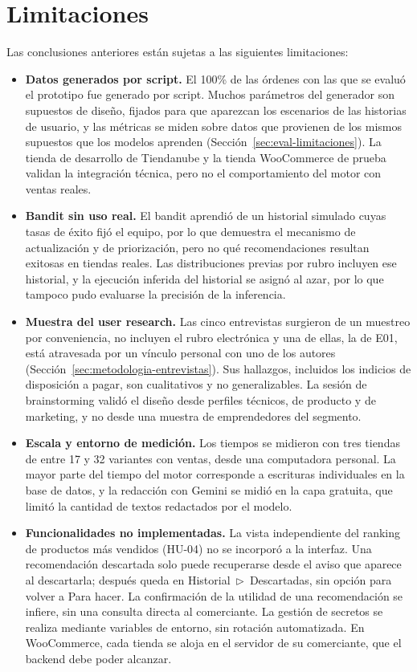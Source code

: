 \section{Limitaciones}
\label{sec:conclusiones-limitaciones}

Las conclusiones anteriores están sujetas a las siguientes limitaciones:

\begin{itemize}
    \item \textbf{Datos generados por script.} El 100\% de las órdenes con las que se evaluó el prototipo fue generado por script. Muchos parámetros del generador son supuestos de diseño, fijados para que aparezcan los escenarios de las historias de usuario, y las métricas se miden sobre datos que provienen de los mismos supuestos que los modelos aprenden (Sección~\ref{sec:eval-limitaciones}). La tienda de desarrollo de Tiendanube y la tienda WooCommerce de prueba validan la integración técnica, pero no el comportamiento del motor con ventas reales.
    \item \textbf{Bandit sin uso real.} El bandit aprendió de un historial simulado cuyas tasas de éxito fijó el equipo, por lo que demuestra el mecanismo de actualización y de priorización, pero no qué recomendaciones resultan exitosas en tiendas reales. Las distribuciones previas por rubro incluyen ese historial, y la ejecución inferida del historial se asignó al azar, por lo que tampoco pudo evaluarse la precisión de la inferencia.
    \item \textbf{Muestra del user research.} Las cinco entrevistas surgieron de un muestreo por conveniencia, no incluyen el rubro electrónica y una de ellas, la de E01, está atravesada por un vínculo personal con uno de los autores (Sección~\ref{sec:metodologia-entrevistas}). Sus hallazgos, incluidos los indicios de disposición a pagar, son cualitativos y no generalizables. La sesión de brainstorming validó el diseño desde perfiles técnicos, de producto y de marketing, y no desde una muestra de emprendedores del segmento.
    \item \textbf{Escala y entorno de medición.} Los tiempos se midieron con tres tiendas de entre 17 y 32 variantes con ventas, desde una computadora personal. La mayor parte del tiempo del motor corresponde a escrituras individuales en la base de datos, y la redacción con Gemini se midió en la capa gratuita, que limitó la cantidad de textos redactados por el modelo.
    \item \textbf{Funcionalidades no implementadas.} La vista independiente del ranking de productos más vendidos (HU-04) no se incorporó a la interfaz. Una recomendación descartada solo puede recuperarse desde el aviso que aparece al descartarla; después queda en Historial~$\triangleright$~Descartadas, sin opción para volver a Para hacer. La confirmación de la utilidad de una recomendación se infiere, sin una consulta directa al comerciante. La gestión de secretos se realiza mediante variables de entorno, sin rotación automatizada. En WooCommerce, cada tienda se aloja en el servidor de su comerciante, que el backend debe poder alcanzar.

\end{itemize}
